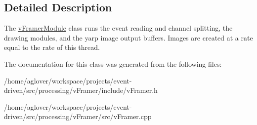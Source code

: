 \subsection{Detailed Description}
The \hyperlink{classvFramerModule}{v\+Framer\+Module} class runs the event reading and channel splitting, the drawing modules, and the yarp image output buffers. Images are created at a rate equal to the rate of this thread. 

The documentation for this class was generated from the following files\+:\begin{DoxyCompactItemize}
\item 
/home/aglover/workspace/projects/event-\/driven/src/processing/v\+Framer/include/v\+Framer.\+h\item 
/home/aglover/workspace/projects/event-\/driven/src/processing/v\+Framer/src/v\+Framer.\+cpp\end{DoxyCompactItemize}
